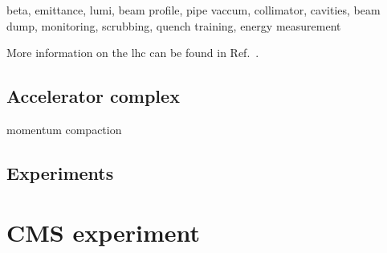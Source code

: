 beta, emittance, lumi, beam profile, pipe vaccum, collimator, cavities, beam dump, monitoring, scrubbing, quench training, energy measurement

More information on the \gls{lhc} can be found in Ref.~\cite{Evans:2008zzb}.

\subsection{Accelerator complex}




momentum compaction

\subsection{Experiments}

\section{CMS experiment}

